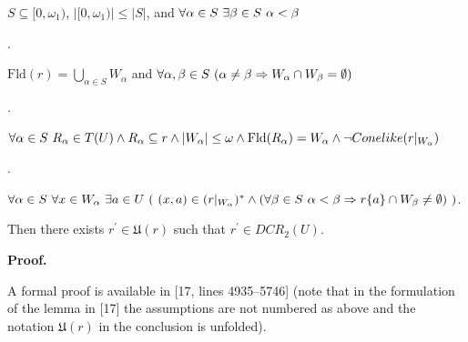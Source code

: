 \documentclass[10pt,a4paper]{amsart}
\begin{document}
$S\subseteq[0,\omega_{1})$, $|[0,\omega_{1})|\leq|S|$, and $\forall\alpha\in S\leavevmode\nobreak\ \exists\beta\in S\leavevmode\nobreak\ %
\alpha<\beta$\par
 
 
 
\par{}. 
 
$\mathrm{Fld}(r)=\bigcup_{\alpha\in S}W_{\alpha}$ and $\forall\alpha,\beta\in S\leavevmode\nobreak\ (\alpha\neq\beta\Rightarrow W_{%
\alpha}\cap W_{\beta}=\emptyset)$\par
 
 
 
\par{}. 
 
$\forall\alpha\in S\leavevmode\nobreak\ R_{\alpha}\in T(U)\wedge R_{\alpha}%
\subseteq r\wedge|W_{\alpha}|\leq\omega\wedge\mathrm{Fld}(R_{\alpha})=W_{%
\alpha}\wedge\neg Conelike(r|_{W_{\alpha}})$\par
 
 
 
\par{}. 
 
$\forall\alpha\in S\leavevmode\nobreak\ \forall x\in W_{\alpha}\leavevmode%
\nobreak\ \exists a\in U\,\left(\leavevmode\nobreak\ (x,a)\in(r|_{W_{\alpha}})%
^{*}\wedge(\forall\beta\in S\leavevmode\nobreak\ \alpha<\beta\Rightarrow r\{a%
\}\cap W_{\beta}\neq\emptyset)\leavevmode\nobreak\ \right)$.\par
 
 
  
 
 
Then there exists $r^{\prime}\in\mathfrak{U}(r)$ such that $r^{\prime}\in DCR_{2}(U)$.\par
 
 
 
 
\par\medskip\noindent\textbf{Proof.}\par
 
 
A formal proof is available in [17, lines 4935–5746] (note that in the formulation of the lemma in [17] the assumptions are not numbered as above and the notation $\mathfrak{U}(r)$ in the conclusion is unfolded).\par
 
\end{document}
